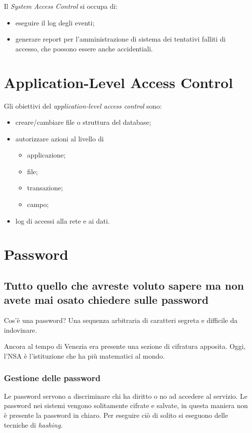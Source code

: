 Il \textit{System Access Control} si occupa di:
\begin{itemize}
 \item eseguire il log degli eventi;
 \item generare report per l'amministrazione di sistema dei tentativi falliti
di accesso, che possono essere anche accidentiali.
\end{itemize}

\section{Application-Level Access Control}

Gli obiettivi del \textit{application-level access control} sono:
\begin{itemize}
 \item creare/cambiare file o struttura del database;
 \item autorizzare azioni al livello di
  \begin{itemize}
   \item applicazione;
   \item file;
   \item transazione;
   \item campo;
  \end{itemize}
\item log di accessi alla rete e ai dati.
\end{itemize}

\section{Password}
\label{Password}

\subsection{Tutto quello che avreste voluto sapere ma non avete mai osato
chiedere sulle password}

Cos'è una password? Una sequenza arbitraria di caratteri segreta e difficile da
indovinare.

Ancora al tempo di Venezia era presente una sezione di cifratura
apposita. Oggi, l'NSA è l'istituzione che ha più matematici al mondo.

\subsubsection{Gestione delle password}

Le password servono a discriminare chi ha diritto o no ad accedere al servizio.
Le password nei sistemi vengono solitamente cifrate e salvate, in questa
maniera non è presente la password in chiaro. Per eseguire ciò di solito si
eseguono delle tecniche di \textit{hashing}.


